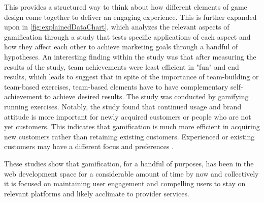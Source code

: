 This provides a structured way to think about how different elements of game design come together to deliver an engaging experience. 
This is further expanded upon in \ref{fig:explainedDataChart}, which analyzes the relevant aspects of gamification through a study that tests specific applications of each aspect and how they affect each other to achieve marketing goals through a handful of hypotheses. 
An interesting finding within the study was that after measuring the results of the study, team achievements were least efficient in "fun" and end results, which leads to suggest that in spite of the importance of team-building or team-based exercises, team-based elements have to have complementary self-achievement to achieve desired results. 
The study was conducted by gamifying running exercises. 
Notably, the study found that continued usage and brand attitude is more important for newly acquired customers or people who are not yet customers. 
This indicates that gamification is much more efficient in acquiring new customers rather than retaining existing customers. 
Experienced or existing customers may have a different focus and preferences \cite{sustainability}.

These studies show that gamification, for a handful of purposes, has been in the web development space for a considerable amount of time by now and collectively it is focused on maintaining user engagement and compelling users to stay on relevant platforms and likely acclimate to provider services\cite{userEngagement}\cite{gamificationEngagement}.
%
\newpage